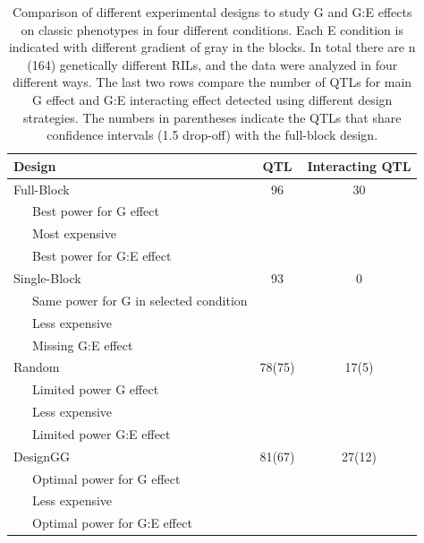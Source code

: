 \begin{table}[h!]
  \begin{center}
  {\footnotesize
  \begin{tabular}{ l  c  c }
    \hline
    {\bf Design} & {\bf QTL} & {\bf Interacting QTL}\\
    \hline
    Full-Block     & 96     & 30\\
    \ \ \ Best power for G effect & &\\
    \ \ \ Most expensive & &\\
    \ \ \ Best power for G:E effect & &\\

    Single-Block   & 93     & 0\\
    \ \ \ Same power for G in selected condition & &\\
    \ \ \ Less expensive & &\\
    \ \ \ Missing G:E effect & &\\
    Random         & 78(75) & 17(5)\\
    \ \ \ Limited power G effect & &\\
    \ \ \ Less expensive & &\\
    \ \ \ Limited power G:E effect & &\\
    DesignGG       & 81(67) & 27(12)\\
    \ \ \ Optimal power for G effect & &\\
    \ \ \ Less expensive & &\\
    \ \ \ Optimal power for G:E effect & &\\
    \hline
  \end{tabular}
  }
  \end{center}
  \caption[Comparing different experimental designs]{Comparison of different experimental designs to study G and G:E effects 
  		  on classic phenotypes in four different conditions. Each E condition is indicated with different gradient of gray 
  		  in the blocks. In total there are n (164) genetically different RILs, and the data were analyzed in four different 
  		  ways. The last two rows compare the number of QTLs for main G effect and G:E interacting effect detected using 
  		  different design strategies. The numbers in parentheses indicate the QTLs that share confidence intervals (1.5 
  		  drop-off) with the full-block design.}
    \label{table:designs}
\end{table}

